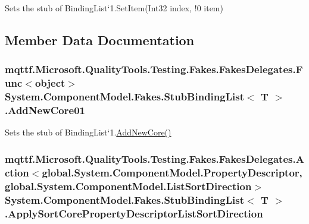 Sets the stub of Binding\-List`1.Set\-Item(Int32 index, !0 item)



\subsection{Member Data Documentation}
\hypertarget{class_system_1_1_component_model_1_1_fakes_1_1_stub_binding_list_3_01_t_01_4_aa45697ca24d77db9cc8659ca392917d7}{
\subsubsection[{Add\-New\-Core01}]{\setlength{\rightskip}{0pt plus 5cm}mqttf.\-Microsoft.\-Quality\-Tools.\-Testing.\-Fakes.\-Fakes\-Delegates.\-Func$<$object$>$ System.\-Component\-Model.\-Fakes.\-Stub\-Binding\-List$<$ T $>$.Add\-New\-Core01}}\label{class_system_1_1_component_model_1_1_fakes_1_1_stub_binding_list_3_01_t_01_4_aa45697ca24d77db9cc8659ca392917d7}


Sets the stub of Binding\-List`1.\hyperlink{class_system_1_1_component_model_1_1_fakes_1_1_stub_binding_list_3_01_t_01_4_a6338d7a3b80c7fa1de5a3d4620a6b96b}{Add\-New\-Core()}

\hypertarget{class_system_1_1_component_model_1_1_fakes_1_1_stub_binding_list_3_01_t_01_4_ad7c3e4ba6cf45990ec8dbf02ca80065e}{
\subsubsection[{Apply\-Sort\-Core\-Property\-Descriptor\-List\-Sort\-Direction}]{\setlength{\rightskip}{0pt plus 5cm}mqttf.\-Microsoft.\-Quality\-Tools.\-Testing.\-Fakes.\-Fakes\-Delegates.\-Action$<$global.\-System.\-Component\-Model.\-Property\-Descriptor, global.\-System.\-Component\-Model.\-List\-Sort\-Direction$>$ System.\-Component\-Model.\-Fakes.\-Stub\-Binding\-List$<$ T $>$.Apply\-Sort\-Core\-Property\-Descriptor\-List\-Sort\-Direction}}\label{class_system_1_1_component_model_1_1_fakes_1_1_stub_binding_list_3_01_t_01_4_ad7c3e4ba6cf45990ec8dbf02ca80065e}


